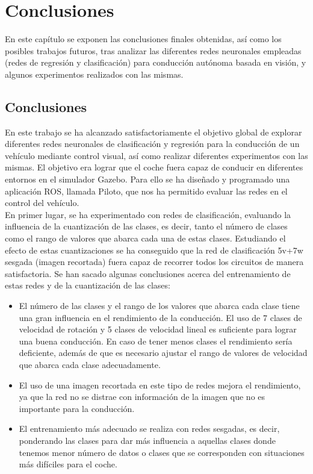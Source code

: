 \chapter{Conclusiones}\label{cap.conclusiones}

En este capítulo se exponen las conclusiones finales obtenidas, así como los posibles trabajos futuros, tras analizar las diferentes redes neuronales empleadas (redes de regresión y clasificación) para conducción autónoma basada en visión, y algunos experimentos realizados con las mismas.

\section{Conclusiones}

En este trabajo se ha alcanzado satisfactoriamente el objetivo global de explorar diferentes redes neuronales de clasificación y regresión para la conducción de un vehículo mediante control visual, así como realizar diferentes experimentos con las mismas. El objetivo era lograr que el coche fuera capaz de conducir en diferentes entornos en el simulador Gazebo. Para ello se ha diseñado y programado una aplicación ROS, llamada Piloto, que nos ha permitido evaluar las redes en el control del vehículo.\\

En primer lugar, se ha experimentado con redes de clasificación, evaluando la influencia de la cuantización de las clases, es decir, tanto el número de clases como el rango de valores que abarca cada una de estas clases. Estudiando el efecto de estas cuantizaciones se ha conseguido que la red de clasificación 5v+7w sesgada (imagen recortada) fuera capaz de recorrer todos los circuitos de manera satisfactoria. Se han sacado algunas conclusiones acerca del entrenamiento de estas redes y de la cuantización de las clases:\\

\begin{itemize}
    \item El número de las clases y el rango de los valores que abarca cada clase tiene una gran influencia en el rendimiento de la conducción. El uso de 7 clases de velocidad de rotación y 5 clases de velocidad lineal es suficiente para lograr una buena conducción. En caso de tener menos clases el rendimiento sería deficiente, además de que es necesario ajustar el rango de valores de velocidad que abarca cada clase adecuadamente.
    
    \item El uso de una imagen recortada en este tipo de redes mejora el rendimiento, ya que la red no se distrae con información de la imagen que no es importante para la conducción.
    
    \item El entrenamiento más adecuado se realiza con redes sesgadas, es decir, ponderando las clases para dar más influencia a aquellas clases donde tenemos menor número de datos o clases que se corresponden con situaciones más difíciles para el coche.
\end{itemize}

